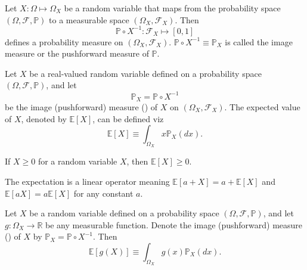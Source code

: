 \begin{definition}
	\label{def:image_measure}
	Let $X: \Omega \mapsto \Omega_X$ be a random variable that maps from the probability space $(\Omega, \mathcal{F}, \mathbb{P})$ to a measurable space $(\Omega_X, \mathcal{F}_X)$. Then~\cite{drewitz2019introduction}
	\begin{equation}
		\mathbb{P}\circ X^{-1}: \mathcal{F}_X\mapsto [0,1]
	\end{equation}
	defines a probability measure on $(\Omega_X, \mathcal{F}_X)$. $\mathbb{P}\circ X^{-1} \equiv \mathbb{P}_X$ is called the image measure or the pushforward measure of $\mathbb{P}$.
\end{definition}

\begin{definition}
	\label{def:expectation_image}
	Let $X$ be a real-valued random variable defined on a probability space $(\Omega, \mathcal{F},\mathbb{P})$, and let
	\begin{equation}
		\mathbb{P}_X = \mathbb{P} \circ X^{-1}
	\end{equation} 
	be the image (pushforward) measure () of $X$ on $(\Omega_X, \mathcal{F}_X)$. The expected value of $X$, denoted by $\mathbb{E}[X]$, can be defined viz
	\begin{equation}
		\mathbb{E}[X] \equiv \int_{\Omega_X} x \mathbb{P}_X(dx).
		\label{eq:expected_value_image}
	\end{equation}
\end{definition}

\begin{theorem}
	If $X\geq 0$ for a random variable $X$, then $\mathbb{E}[X]\geq 0$.
\end{theorem}
\begin{theorem}
	\label{theorem:exp_linear}
	The expectation is a linear operator meaning $\mathbb{E}[a+X] = a+\mathbb{E}[X]$ and $\mathbb{E}[aX] = a\mathbb{E}[X]$ for any constant $a$.
\end{theorem}
\begin{theorem}
	\label{th:lotus}
	Let $X$ be a random variable defined on a probability space $(\Omega, \mathcal{F}, \mathbb{P})$, and let $g: \Omega_X \to \mathbb{R}$ be any measurable function. Denote the image (pushforward) measure () of $X$ by $\mathbb{P}_X = \mathbb{P} \circ X^{-1}$. Then
	\begin{equation}
		\mathbb{E}[g(X)] \equiv \int_{\Omega_X} g(x) \mathbb{P}_X(dx).
		\label{eq:lotus_image}
	\end{equation}
\end{theorem}


